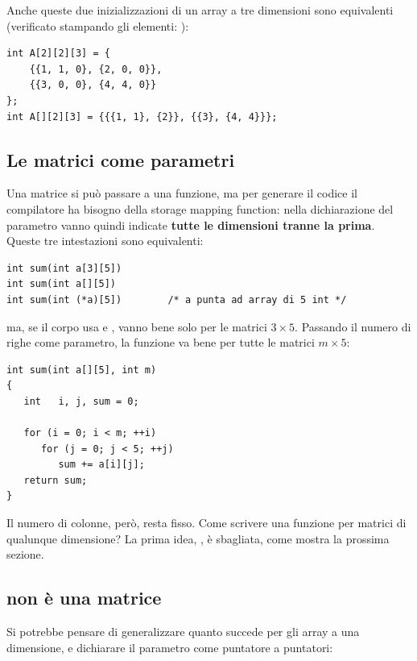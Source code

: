 Anche queste due inizializzazioni di un array a tre dimensioni sono
equivalenti (verificato stampando gli elementi: ):

\begin{lstlisting}[style=c]
int A[2][2][3] = {
    {{1, 1, 0}, {2, 0, 0}},
    {{3, 0, 0}, {4, 4, 0}}
};
int A[][2][3] = {{{1, 1}, {2}}, {{3}, {4, 4}}};
\end{lstlisting}

\subsection{Le matrici come parametri}

Una matrice si può passare a una funzione, ma per generare il codice il
compilatore ha bisogno della storage mapping function: nella dichiarazione
del parametro vanno quindi indicate \textbf{tutte le dimensioni tranne la
prima}. Queste tre intestazioni sono equivalenti:

\begin{lstlisting}[style=c]
int sum(int a[3][5])
int sum(int a[][5])
int sum(int (*a)[5])        /* a punta ad array di 5 int */
\end{lstlisting}

ma, se il corpo usa  e , vanno bene solo per le
matrici $3 \times 5$. Passando il numero di righe come parametro, la funzione
va bene per tutte le matrici $m \times 5$:

\begin{affianco}[0.5][c]
\begin{lstlisting}[style=c, name=sum2d.c]
int sum(int a[][5], int m)
{
   int   i, j, sum = 0;

   for (i = 0; i < m; ++i)
      for (j = 0; j < 5; ++j)
         sum += a[i][j];
   return sum;
}
\end{lstlisting}
\risultato
Il numero di colonne, però, resta fisso. Come scrivere una funzione per
matrici di qualunque dimensione? La prima idea, , è sbagliata,
come mostra la prossima sezione.
\end{affianco}

\subsection{ non è una matrice}

Si potrebbe pensare di generalizzare quanto succede per gli array a una
dimensione, e dichiarare il parametro come puntatore a puntatori:


